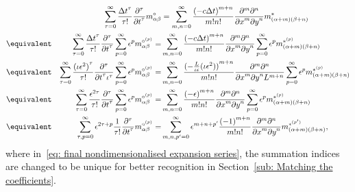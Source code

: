 \begin{alignat}{3}
  \nonumber
  &&\sum_{\tau = 0}^\infty \frac{{\Delta t}^\tau }{\tau!} \frac{\partial^\tau}{{\partial t}^\tau} m_{\alpha\beta}^{\circ} &=
 \sum_{m,n = 0}^\infty \frac{{(- c\Delta t)}^{m+n}} {m!n!} \frac{\partial^m \partial^n}{ {\partial x}^m{\partial y}^n} m^*_{(\alpha + m)(\beta + n)}\\
  \nonumber
  &\equivalent& \sum_{\tau = 0}^\infty \frac{{\Delta t}^\tau }{\tau!}  \frac{\partial^\tau}{{\partial t}^\tau} \sum_{p=0}^{\infty} \epsilon^p m_{\alpha\beta}^{\circ^{(p)}}
    = &{}\sum_{m,n = 0}^\infty \frac{{(-c\Delta t)}^{m+n}} {m!n!} \frac{\partial^m \partial^n}{ {\partial x}^m{\partial y}^n} \sum_{p=0}^{\infty} \epsilon^p m_{(\alpha + m)(\beta + n)}^{*^{(p)}}
  \\
    \label{eq: nondimensionalised expansion series}
  &\equivalent&
    \sum_{\tau = 0}^\infty \frac{{(\iota\epsilon^2)}^\tau }{\tau!} \frac{\partial^\tau}{{\partial t}^\tau \iota^\tau} \sum_{p=0}^{\infty} \epsilon^p m_{\alpha\beta}^{\circ^{(p)}}
    = &{}\sum_{m,n = 0}^\infty \frac{{(-\frac{L}{\iota\epsilon}(\iota\epsilon^2))}^{m+n}} {m!n!}
    \frac{\partial^m \partial^n}{ {\partial x}^m{\partial y}^n L^{m+n}} \sum_{p=0}^{\infty} \epsilon^p m_{(\alpha + m)(\beta + n)}^{*^{(p)}}
   \\
  \nonumber
  &\equivalent&
    \sum_{\tau = 0}^\infty \frac{\epsilon^{2\tau} }{\tau!} \frac{\partial^\tau}{{\partial t}^\tau} \sum_{p=0}^{\infty} \epsilon^p m_{\alpha\beta}^{\circ^{(p)}}
    = &{}\sum_{m,n = 0}^\infty \frac{{(-\epsilon)}^{m+n}} {m!n!}
    \frac{\partial^m \partial^n}{ {\partial x}^m{\partial y}^n } \sum_{p=0}^{\infty} \epsilon^p m_{(\alpha + m)(\beta + n)}^{*^{(p)}}
   \\
    \label{eq: final nondimensionalised expansion series}
  &\equivalent&
    \sum_{\tau, p = 0}^\infty\epsilon^{2\tau + p} \frac{1} {\tau!} \frac{\partial^\tau}{{\partial t}^\tau} m_{\alpha\beta}^{\circ^{(p)}}
    = &{} \sum_{m,n,p' = 0}^\infty  \epsilon^{m+n+p'} \frac{{(-1)}^{m+n}} {m!n!}
    \frac{\partial^m \partial^n}{ {\partial x}^m{\partial y}^n } m_{(\alpha + m)(\beta + n)}^{*^{(p')}},
\end{alignat}
where in~\eqref{eq: final nondimensionalised expansion series}, the summation indices are changed to be unique for better recognition in Section~\ref{sub: Matching the coefficients}.

